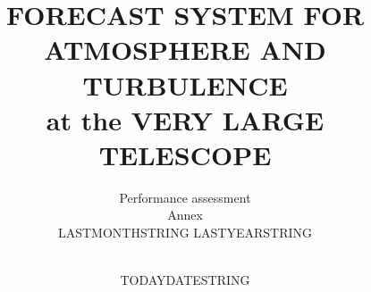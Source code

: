 \documentclass[a4paper]{article}
\title{FORECAST SYSTEM FOR ATMOSPHERE AND TURBULENCE\\
at the VERY LARGE TELESCOPE}
\author{
\vspace{1.0cm}
\begin{minipage}{9.5cm}
\begin{center}
\LARGE{Performance assessment}\\
\LARGE{Annex}\\
\LARGE{LASTMONTHSTRING LASTYEARSTRING}
\end{center}
\end{minipage}\\
\vspace{3cm}
}
\date{TODAYDATESTRING}
\begin{document}
 
\maketitle 


\contents     %



%
%
%
%
\end{document}
